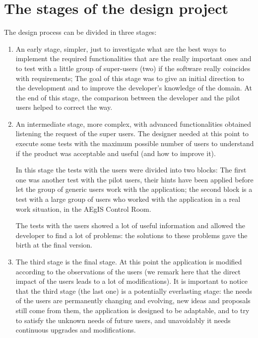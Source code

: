 \section{The stages of the design project}

The design process can be divided in three stages:

\begin{enumerate}

\item An early stage, simpler, just to investigate what are the best ways to implement the required functionalities that are the really important ones and to test with a little group of super-users (two) if the software really coincides with requirements; The goal of this stage was to give an initial direction to the development and to improve the developer's knowledge of the domain. At the end of this stage, the comparison between the developer and the pilot users helped to correct the way.

\item An intermediate stage, more complex, with advanced functionalities obtained listening the request of the super users.  
The designer needed at this point to execute some tests with the maximum possible number of users to understand if the product was acceptable and useful (and how to improve it). 

In this stage the tests with the users were divided into two blocks:  
The first one was another test with the pilot users, their hints have been applied before let the group of generic users work with the application;
the second block is a test with a large group of users who worked with the application in a real work situation, in the AEgIS Control Room.

The tests with the users showed a lot of useful information and allowed the developer to find a lot of problems: the solutions to these problems gave the birth at the final version. 

\item
The third stage is the final stage. At this point the application is modified according to the observations of the users (we remark here that the direct impact of the users leads to a lot of modifications). It is important to notice that the third stage (the last one) is a potentially everlasting stage: the needs of the users are permanently changing and evolving, new ideas and proposals still come from them, the application is designed to be adaptable, and to try to satisfy the unknown needs of future users, and unavoidably it needs continuous upgrades and modifications. 

\end{enumerate}


